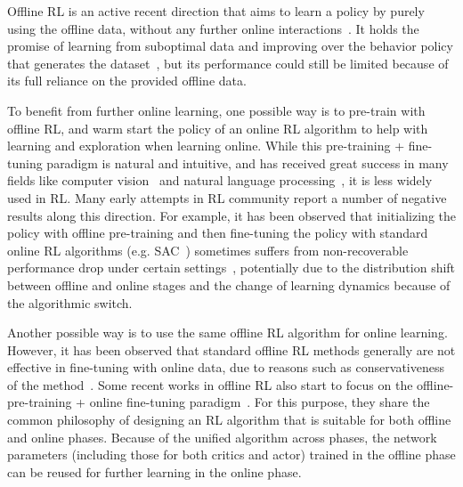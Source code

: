 \documentclass{article}
\begin{document}
Offline RL is an active recent direction that aims to learn a policy by purely using the offline data,
without any further online interactions~\citep{BCQ, cql, td3bc, offline_rl, offline_rl_adaptive, DT, TT, yang21, Lu22, zheng22}.
It holds the promise of learning from suboptimal data and improving over the behavior policy that generates the dataset~\citep{kumar2022should}, but its performance could still be limited because of its full reliance on the provided offline data.


To benefit from further online learning, one  possible way is to pre-train with offline RL, and warm start the policy of an online RL algorithm to help with learning and exploration  when learning online.
While this pre-training + fine-tuning paradigm is natural and intuitive, and has received great success in many fields like computer vision~\citep{finetune_cv, imagenet_transfer} and natural language processing~\citep{bert, gpt1, gpt3},
it is less widely used in RL.
Many early attempts  in RL community report a number of negative results along this direction.
For example, it has been observed that initializing the policy with offline pre-training  and then fine-tuning the policy with standard online RL algorithms ({e.g.} SAC~\citep{sac}) sometimes suffers from non-recoverable performance drop under certain settings~\citep{AWAC, jump_start_RL}, potentially due to the distribution shift between offline and online stages and the change of learning dynamics because of the algorithmic switch.


Another possible way is to use the same offline RL algorithm for online learning. However, it has been observed that
standard offline RL methods generally are not effective in fine-tuning with online data, due to reasons such as conservativeness of the method~\citep{AWAC}.
Some recent works in offline RL also start to focus on the offline-pre-training + online fine-tuning paradigm~\citep{AWAC, iql}.
For this purpose, they share the common philosophy of designing an RL algorithm that is suitable for both offline and online phases.
Because of the unified algorithm across phases, the network parameters (including those for both critics and actor) trained in the offline phase can be reused for further learning in the online phase.
\end{document}
